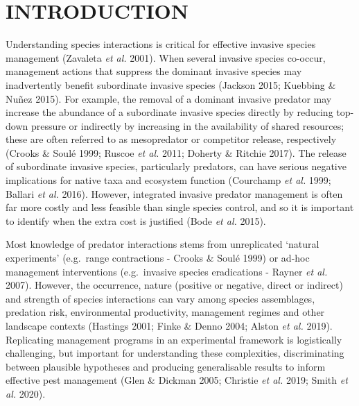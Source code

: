 \documentclass[]{elsarticle} %
\begin{document}
\newpage

\hypertarget{introduction}{%
\section{INTRODUCTION}\label{introduction}}

Understanding species interactions is critical for effective invasive species management (Zavaleta \emph{et al.} 2001). When several invasive species co-occur, management actions that suppress the dominant invasive species may inadvertently benefit subordinate invasive species (Jackson 2015; Kuebbing \& Nuñez 2015). For example, the removal of a dominant invasive predator may increase the abundance of a subordinate invasive species directly by reducing top-down pressure or indirectly by increasing in the availability of shared resources; these are often referred to as mesopredator or competitor release, respectively (Crooks \& Soulé 1999; Ruscoe \emph{et al.} 2011; Doherty \& Ritchie 2017). The release of subordinate invasive species, particularly predators, can have serious negative implications for native taxa and ecosystem function (Courchamp \emph{et al.} 1999; Ballari \emph{et al.} 2016). However, integrated invasive predator management is often far more costly and less feasible than single species control, and so it is important to identify when the extra cost is justified (Bode \emph{et al.} 2015).

Most knowledge of predator interactions stems from unreplicated `natural experiments' (e.g.~range contractions - Crooks \& Soulé 1999) or ad-hoc management interventions (e.g.~invasive species eradications - Rayner \emph{et al.} 2007). However, the occurrence, nature (positive or negative, direct or indirect) and strength of species interactions can vary among species assemblages, predation risk, environmental productivity, management regimes and other landscape contexts (Hastings 2001; Finke \& Denno 2004; Alston \emph{et al.} 2019). Replicating management programs in an experimental framework is logistically challenging, but important for understanding these complexities, discriminating between plausible hypotheses and producing generalisable results to inform effective pest management (Glen \& Dickman 2005; Christie \emph{et al.} 2019; Smith \emph{et al.} 2020).
\end{document}
